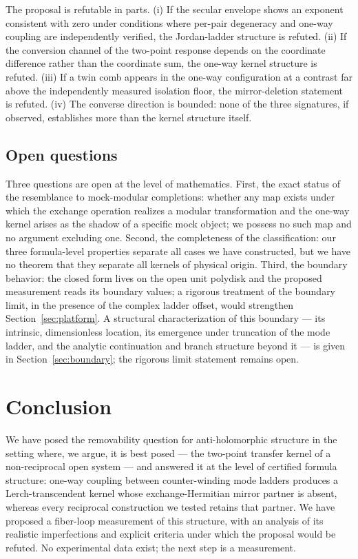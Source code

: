 \documentclass[11pt,a4paper]{article}
\begin{document}
The proposal is refutable in parts. (i) If the secular envelope shows an
exponent consistent with zero under conditions where per-pair degeneracy and
one-way coupling are independently verified, the Jordan-ladder structure is
refuted. (ii) If the conversion channel of the two-point response depends on
the coordinate difference rather than the coordinate sum, the one-way kernel
structure is refuted. (iii) If a twin comb appears in the one-way configuration
at a contrast far above the independently measured isolation floor, the
mirror-deletion statement is refuted. (iv) The converse direction is bounded:
none of the three signatures, if observed, establishes more than the kernel
structure itself.

\subsection{Open questions}

Three questions are open at the level of mathematics. First, the exact status
of the resemblance to mock-modular completions: whether any map exists under
which the exchange operation realizes a modular transformation and the one-way
kernel arises as the shadow of a specific mock object; we possess no such map
and no argument excluding one. Second, the completeness of the classification:
our three formula-level properties separate all cases we have constructed, but
we have no theorem that they separate all kernels of physical origin. Third,
the boundary behavior: the closed form lives on the open unit polydisk and the
proposed measurement reads its boundary values; a rigorous treatment of the
boundary limit, in the presence of the complex ladder offset, would strengthen
Section~\ref{sec:platform}. A structural characterization of this boundary --- its intrinsic, dimensionless location, its emergence under truncation of the mode ladder, and the analytic continuation and branch structure beyond it --- is given in Section~\ref{sec:boundary}; the rigorous limit statement remains open.

\section{Conclusion}

We have posed the removability question for anti-holomorphic structure in the
setting where, we argue, it is best posed --- the two-point transfer kernel of
a non-reciprocal open system --- and answered it at the level of certified
formula structure: one-way coupling between counter-winding mode ladders
produces a Lerch-transcendent kernel whose exchange-Hermitian mirror partner is
absent, whereas every reciprocal construction we tested retains that partner.
We have proposed a fiber-loop measurement of this structure, with an analysis
of its realistic imperfections and explicit criteria under which the proposal
would be refuted. No experimental data exist; the next step is a measurement.
\end{document}
